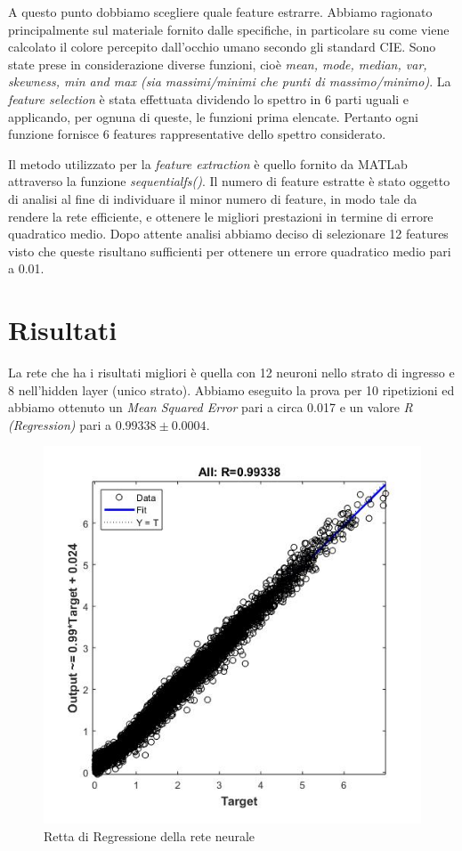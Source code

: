 A questo punto dobbiamo scegliere quale feature estrarre. Abbiamo ragionato principalmente sul materiale fornito dalle specifiche, in particolare su come viene calcolato il colore percepito dall'occhio umano secondo gli standard CIE. Sono state prese in considerazione diverse funzioni, cioè \textit{mean, mode, median, var, skewness, min and max (sia massimi/minimi che punti di massimo/minimo)}. La \textit{feature selection} è stata effettuata dividendo lo spettro in 6 parti uguali e applicando, per ognuna di queste, le funzioni prima elencate. Pertanto ogni funzione fornisce 6 features rappresentative dello spettro considerato.

Il metodo utilizzato per la \textit{feature extraction} è quello fornito da MATLab attraverso la funzione \textit{sequentialfs()}. Il numero di feature estratte è stato oggetto di analisi al fine di individuare il minor numero di feature, in modo tale da rendere la rete efficiente, e ottenere le migliori prestazioni in termine di errore quadratico medio. Dopo attente analisi abbiamo deciso di selezionare 12 features visto che queste risultano sufficienti per ottenere un errore quadratico medio pari a 0.01.

\section{Risultati}
La rete che ha i risultati migliori è quella con 12 neuroni nello strato di ingresso e 8 nell'hidden layer (unico strato). Abbiamo eseguito la prova per 10 ripetizioni ed abbiamo ottenuto un \textit{Mean Squared Error} pari a circa 0.017 e un valore \textit{R (Regression)} pari a \(0.99338 \pm 0.0004\).

\begin{figure}[!ht]
\begin{center}
	\includegraphics[scale=0.7]{images/rete1-regression.jpg}
\end{center}
\caption{Retta di Regressione della rete neurale}
\end{figure}

